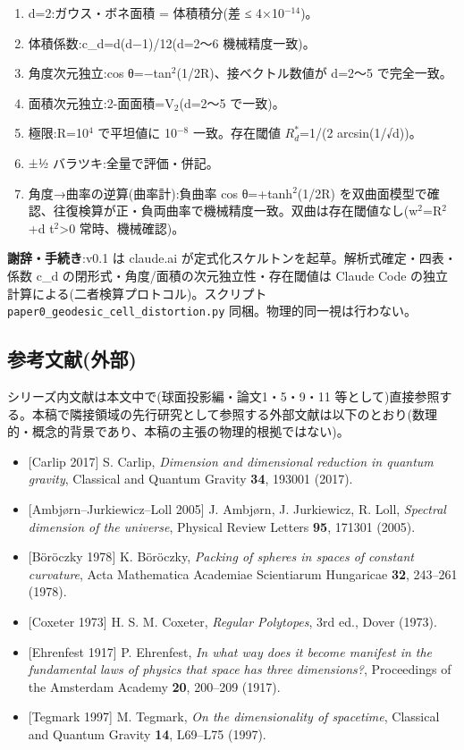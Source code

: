 \documentclass[
]{ltjsarticle}
\providecommand{\tightlist}{%
  \setlength{\itemsep}{0pt}\setlength{\parskip}{0pt}}
\begin{document}
\begin{enumerate}
\def\labelenumi{\arabic{enumi}.}
\tightlist
\item
  d=2:ガウス・ボネ面積 = 体積積分(差 ≤ 4×10\(^{-14}\))。
\item
  体積係数:c\_d=d(d−1)/12(d=2〜6 機械精度一致)。
\item
  角度次元独立:cos θ=−tan\(^{2}\)(1/2R)、接ベクトル数値が d=2〜5
  で完全一致。
\item
  面積次元独立:2-面面積=V\(_{2}\)(d=2〜5 で一致)。
\item
  極限:R=10\(^{4}\) で平坦値に 10\(^{-8}\) 一致。存在閾値
  \(R^{*}_{d}\)=1/(2 arcsin(1/√d))。
\item
  ±½ バラツキ:全量で評価・併記。
\item
  角度→曲率の逆算(曲率計):負曲率 cos θ=+tanh\(^{2}\)(1/2R)
  を双曲面模型で確認、往復検算が正・負両曲率で機械精度一致。双曲は存在閾値なし(w\(^{2}\)=R\(^{2}\)+d
  t\(^{2}\)\textgreater0 常時、機械確認)。
\end{enumerate}

\textbf{謝辞・手続き}:v0.1 は claude.ai
が定式化スケルトンを起草。解析式確定・四表・係数 c\_d
の閉形式・角度/面積の次元独立性・存在閾値は Claude Code
の独立計算による(二者検算プロトコル)。スクリプト
\texttt{paper0\_geodesic\_cell\_distortion.py}
同梱。物理的同一視は行わない。

\subsection{参考文献(外部)}\label{ux53c2ux8003ux6587ux732eux5916ux90e8}

シリーズ内文献は本文中で(球面投影編・論文1・5・9・11
等として)直接参照する。本稿で隣接領域の先行研究として参照する外部文献は以下のとおり(数理的・概念的背景であり、本稿の主張の物理的根拠ではない)。

\begin{itemize}
\tightlist
\item
  {[}Carlip 2017{]} S. Carlip, \emph{Dimension and dimensional reduction
  in quantum gravity}, Classical and Quantum Gravity \textbf{34}, 193001
  (2017).
\item
  {[}Ambjørn--Jurkiewicz--Loll 2005{]} J. Ambjørn, J. Jurkiewicz, R.
  Loll, \emph{Spectral dimension of the universe}, Physical Review
  Letters \textbf{95}, 171301 (2005).
\item
  {[}Böröczky 1978{]} K. Böröczky, \emph{Packing of spheres in spaces of
  constant curvature}, Acta Mathematica Academiae Scientiarum Hungaricae
  \textbf{32}, 243--261 (1978).
\item
  {[}Coxeter 1973{]} H. S. M. Coxeter, \emph{Regular Polytopes}, 3rd
  ed., Dover (1973).
\item
  {[}Ehrenfest 1917{]} P. Ehrenfest, \emph{In what way does it become
  manifest in the fundamental laws of physics that space has three
  dimensions?}, Proceedings of the Amsterdam Academy \textbf{20},
  200--209 (1917).
\item
  {[}Tegmark 1997{]} M. Tegmark, \emph{On the dimensionality of
  spacetime}, Classical and Quantum Gravity \textbf{14}, L69--L75
  (1997).
\end{itemize}
\end{document}
